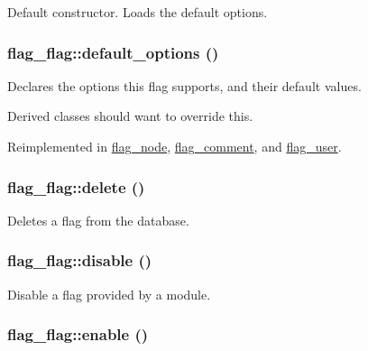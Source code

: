 Default constructor. Loads the default options. \hypertarget{classflag__flag_240678d55d61a16ef848ecc0cc3c609f}{
\subsubsection[{default\_\-options}]{\setlength{\rightskip}{0pt plus 5cm}flag\_\-flag::default\_\-options ()}}
\label{classflag__flag_240678d55d61a16ef848ecc0cc3c609f}


Declares the options this flag supports, and their default values.

Derived classes should want to override this. 

Reimplemented in \hyperlink{classflag__node_e896b1a9f9ef4b26514c52540ec0ef70}{flag\_\-node}, \hyperlink{classflag__comment_022d24a6bb4afca5563c69e0ab50007f}{flag\_\-comment}, and \hyperlink{classflag__user_5df658a9df123b09608c3438a06fe86e}{flag\_\-user}.\hypertarget{classflag__flag_0549e21ec17add57f7e7d0745bd8172d}{
\subsubsection[{delete}]{\setlength{\rightskip}{0pt plus 5cm}flag\_\-flag::delete ()}}
\label{classflag__flag_0549e21ec17add57f7e7d0745bd8172d}


Deletes a flag from the database. \hypertarget{classflag__flag_3d43e21496f28452d54f7e0581790c96}{
\subsubsection[{disable}]{\setlength{\rightskip}{0pt plus 5cm}flag\_\-flag::disable ()}}
\label{classflag__flag_3d43e21496f28452d54f7e0581790c96}


Disable a flag provided by a module. \hypertarget{classflag__flag_5af2edf9238712cca6c20f79fdeeab22}{
\subsubsection[{enable}]{\setlength{\rightskip}{0pt plus 5cm}flag\_\-flag::enable ()}}
\label{classflag__flag_5af2edf9238712cca6c20f79fdeeab22}


